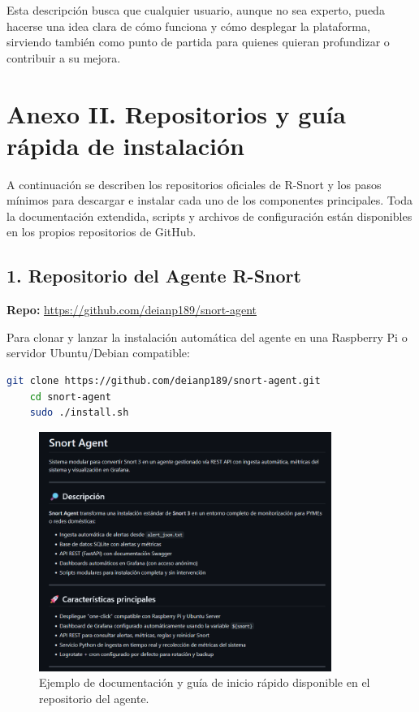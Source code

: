 \documentclass[11pt,a4paper,twoside]{report}
\begin{document}
Esta descripción busca que cualquier usuario, aunque no sea experto, pueda hacerse una idea clara de cómo funciona y cómo desplegar la plataforma, sirviendo también como punto de partida para quienes quieran profundizar o contribuir a su mejora.

\chapter*{Anexo II. Repositorios y guía rápida de instalación}

A continuación se describen los repositorios oficiales de R-Snort y los pasos mínimos para descargar e instalar cada uno de los componentes principales. Toda la documentación extendida, scripts y archivos de configuración están disponibles en los propios repositorios de GitHub.

\section*{1. Repositorio del Agente R-Snort}

\textbf{Repo:} 
\url{https://github.com/deianp189/snort-agent}

Para clonar y lanzar la instalación automática del agente en una Raspberry Pi o servidor Ubuntu/Debian compatible:

\begin{lstlisting}[language=bash]
	git clone https://github.com/deianp189/snort-agent.git
	cd snort-agent
	sudo ./install.sh
\end{lstlisting}

\begin{figure}[H]
	\centering
	\includegraphics[width=0.85\textwidth]{apendix_agent/1.png}
	\caption{Ejemplo de documentación y guía de inicio rápido disponible en el repositorio del agente.}
\end{figure}
\end{document}
